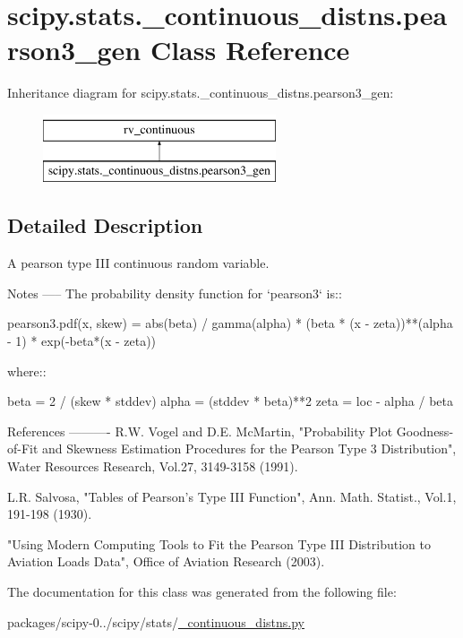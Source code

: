 \hypertarget{classscipy_1_1stats_1_1__continuous__distns_1_1pearson3__gen}{}\section{scipy.\+stats.\+\_\+continuous\+\_\+distns.\+pearson3\+\_\+gen Class Reference}
\label{classscipy_1_1stats_1_1__continuous__distns_1_1pearson3__gen}
Inheritance diagram for scipy.\+stats.\+\_\+continuous\+\_\+distns.\+pearson3\+\_\+gen\+:\begin{figure}[H]
\begin{center}
\leavevmode
\includegraphics[height=2.000000cm]{classscipy_1_1stats_1_1__continuous__distns_1_1pearson3__gen}
\end{center}
\end{figure}


\subsection{Detailed Description}
\begin{DoxyVerb}A pearson type III continuous random variable.


Notes
-----
The probability density function for `pearson3` is::

    pearson3.pdf(x, skew) = abs(beta) / gamma(alpha) *
        (beta * (x - zeta))**(alpha - 1) * exp(-beta*(x - zeta))

where::

        beta = 2 / (skew * stddev)
        alpha = (stddev * beta)**2
        zeta = loc - alpha / beta


References
----------
R.W. Vogel and D.E. McMartin, "Probability Plot Goodness-of-Fit and
Skewness Estimation Procedures for the Pearson Type 3 Distribution", Water
Resources Research, Vol.27, 3149-3158 (1991).

L.R. Salvosa, "Tables of Pearson's Type III Function", Ann. Math. Statist.,
Vol.1, 191-198 (1930).

"Using Modern Computing Tools to Fit the Pearson Type III Distribution to
Aviation Loads Data", Office of Aviation Research (2003).\end{DoxyVerb}
 

The documentation for this class was generated from the following file\+:\begin{DoxyCompactItemize}
\item 
packages/scipy-\/0../scipy/stats/\hyperlink{__continuous__distns_8py}{\+\_\+continuous\+\_\+distns.\+py}\end{DoxyCompactItemize}

